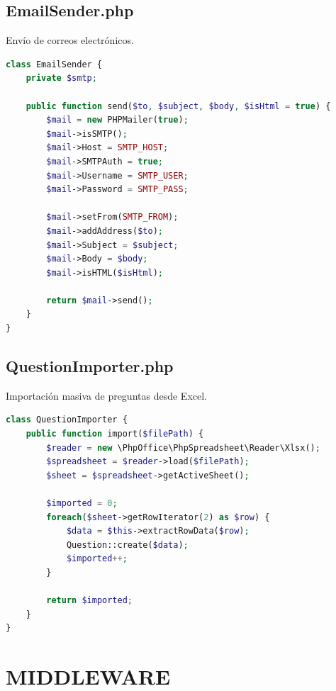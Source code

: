 \documentclass[12pt, a4paper]{report}
\begin{document}
\section{EmailSender.php}
Envío de correos electrónicos.
\begin{lstlisting}[language=PHP]
class EmailSender {
    private $smtp;
    
    public function send($to, $subject, $body, $isHtml = true) {
        $mail = new PHPMailer(true);
        $mail->isSMTP();
        $mail->Host = SMTP_HOST;
        $mail->SMTPAuth = true;
        $mail->Username = SMTP_USER;
        $mail->Password = SMTP_PASS;
        
        $mail->setFrom(SMTP_FROM);
        $mail->addAddress($to);
        $mail->Subject = $subject;
        $mail->Body = $body;
        $mail->isHTML($isHtml);
        
        return $mail->send();
    }
}
\end{lstlisting}

\section{QuestionImporter.php}
Importación masiva de preguntas desde Excel.
\begin{lstlisting}[language=PHP]
class QuestionImporter {
    public function import($filePath) {
        $reader = new \PhpOffice\PhpSpreadsheet\Reader\Xlsx();
        $spreadsheet = $reader->load($filePath);
        $sheet = $spreadsheet->getActiveSheet();
        
        $imported = 0;
        foreach($sheet->getRowIterator(2) as $row) {
            $data = $this->extractRowData($row);
            Question::create($data);
            $imported++;
        }
        
        return $imported;
    }
}
\end{lstlisting}

\chapter{MIDDLEWARE}
\end{document}
